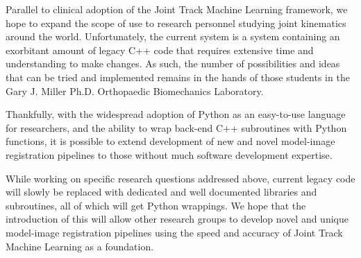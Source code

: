 Parallel to clinical adoption of the Joint Track Machine Learning framework, we hope to expand the scope of use to research personnel studying joint kinematics around the world. Unfortunately, the current system is a system containing an exorbitant amount of legacy C++ code that requires extensive time and understanding to make changes. As such, the number of possibilities and ideas that can be tried and implemented remains in the hands of those students in the Gary J. Miller Ph.D. Orthopaedic Biomechanics Laboratory.

Thankfully, with the widespread adoption of Python as an easy-to-use language for researchers, and the ability to wrap back-end C++ subroutines with Python functions, it is possible to extend development of new and novel model-image registration pipelines to those without much software development expertise.

While working on specific research questions addressed above, current legacy code will slowly be replaced with dedicated and well documented libraries and subroutines, all of which will get Python wrappings. We hope that the introduction of this will allow other research groups to develop novel and unique model-image registration pipelines using the speed and accuracy of Joint Track Machine Learning as a foundation.

